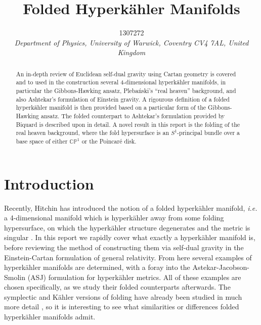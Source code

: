 \documentclass[a4paper,12pt, onecolumn, notitlepage]{article}
\theoremstyle{definition}
\theoremstyle{remark}
\newcommand{\ie}{\emph{i.e.} }
\newcommand{\K}{K\"ahler }
\newcommand{\HK}{hyperk\"ahler }
\begin{document}
\title{\textbf{\large{Folded Hyperk\"ahler Manifolds}}}
	
\author{\normalsize{1307272} \\
	\small\textit{
		Department of Physics, University of Warwick,
		Coventry CV4 7AL, United Kingdom}}
\date{}
\maketitle 
\vspace{-10mm}
\begin{abstract} 
\noindent
An in-depth review of Euclidean self-dual gravity using Cartan geometry is covered and to used in the construction several 4-dimensional \HK manifolds, in particular the Gibbons-Hawking ansatz, Pleba\'nski's ``real heaven'' background, and also Ashtekar's formulation of Einstein gravity.
A rigourous definition of a folded \HK manifold is then provided based on a particular form of the Gibbons-Hawking ansatz. The folded counterpart to Ashtekar's formulation provided by Biquard is described upon in detail. A novel result in this report is the folding of the real heaven background, where the fold hypersurface is an $S^{1}$-principal bundle over a base space of either $\mathbb{CP}^{1}$ or the Poincar\'e disk.
\end{abstract}
\vspace{11mm}	
	
\section{Introduction}
Recently, Hitchin has introduced the notion of a folded hyperk{\"a}hler manifold, \ie a 4-dimensional manifold which is hyperk{\"a}hler away from some folding hypersurface, on which the hyperk{\"a}hler structure degenerates and the metric is singular \cite{hitchin_2015,biquard_2015}. In this report we rapidly cover what exactly a \HK manifold is, before reviewing the method of constructing them via self-dual gravity in the Einstein-Cartan formulation of general relativity. From here several examples of \HK manifolds are determined, with a foray into the Astekar-Jacobson-Smolin (ASJ) formulation for \HK metrics. All of these examples are chosen specifically, as we study their folded counterparts afterwards. The symplectic and \K versions of folding have already been studied in much more detail \cite{dasilva_2000,baykur_2006}, so it is interesting to see what similarities or differences folded \HK manifolds admit.\\
\end{document}
